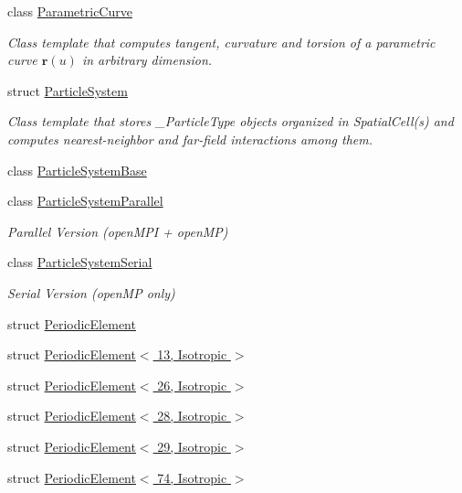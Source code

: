 \begin{DoxyCompactItemize}
\item 
class \hyperlink{classmodel_1_1_parametric_curve}{Parametric\+Curve}
\begin{DoxyCompactList}\small\item\em Class template that computes tangent, curvature and torsion of a parametric curve $\mathbf{r}(u)$ in arbitrary dimension. \end{DoxyCompactList}\item 
struct \hyperlink{structmodel_1_1_particle_system}{Particle\+System}
\begin{DoxyCompactList}\small\item\em Class template that stores \+\_\+\+Particle\+Type objects organized in Spatial\+Cell(s) and computes nearest-\/neighbor and far-\/field interactions among them. \end{DoxyCompactList}\item 
class \hyperlink{classmodel_1_1_particle_system_base}{Particle\+System\+Base}
\item 
class \hyperlink{classmodel_1_1_particle_system_parallel}{Particle\+System\+Parallel}
\begin{DoxyCompactList}\small\item\em Parallel Version (open\+M\+P\+I + open\+M\+P) \end{DoxyCompactList}\item 
class \hyperlink{classmodel_1_1_particle_system_serial}{Particle\+System\+Serial}
\begin{DoxyCompactList}\small\item\em Serial Version (open\+M\+P only) \end{DoxyCompactList}\item 
struct \hyperlink{structmodel_1_1_periodic_element}{Periodic\+Element}
\item 
struct \hyperlink{structmodel_1_1_periodic_element_3_0113_00_01_isotropic_01_4}{Periodic\+Element$<$ 13, Isotropic $>$}
\item 
struct \hyperlink{structmodel_1_1_periodic_element_3_0126_00_01_isotropic_01_4}{Periodic\+Element$<$ 26, Isotropic $>$}
\item 
struct \hyperlink{structmodel_1_1_periodic_element_3_0128_00_01_isotropic_01_4}{Periodic\+Element$<$ 28, Isotropic $>$}
\item 
struct \hyperlink{structmodel_1_1_periodic_element_3_0129_00_01_isotropic_01_4}{Periodic\+Element$<$ 29, Isotropic $>$}
\item 
struct \hyperlink{structmodel_1_1_periodic_element_3_0174_00_01_isotropic_01_4}{Periodic\+Element$<$ 74, Isotropic $>$}

\end{DoxyCompactItemize}
